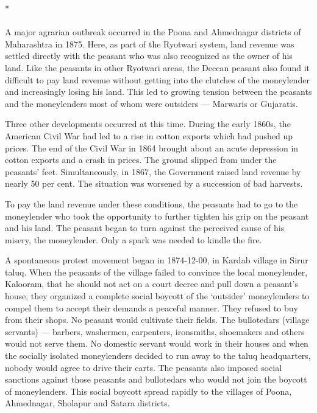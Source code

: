 \begin{center}*\end{center}

\paragraph*{}
A major agrarian outbreak occurred in the Poona and Ahmednagar districts of Maharashtra in 1875. Here, as part of the Ryotwari system, land revenue was settled directly with the peasant who was also recognized as the owner of his land. Like the peasants in other Ryotwari areas, the Deccan peasant also found it difficult to pay land revenue without getting into the clutches of the moneylender and increasingly losing his land. This led to growing tension between the peasants and the moneylenders most of whom were outsiders — Marwaris or Gujaratis.

Three other developments occurred at this time. During the early 1860s, the American Civil War had led to a rise in cotton exports which had pushed up prices. The end of the Civil War in 1864 brought about an acute depression in cotton exports and a crash in prices. The ground slipped from under the peasants' feet. Simultaneously, in 1867, the Government raised land revenue by nearly 50 per cent. The situation was worsened by a succession of bad harvests.

To pay the land revenue under these conditions, the peasants had to go to the moneylender who took the opportunity to further tighten his grip on the peasant and his land. The peasant began to turn against the perceived cause of his misery, the moneylender. Only a spark was needed to kindle the fire.

A spontaneous protest movement began in 1874-12-00, in Kardab village in Sirur taluq. When the peasants of the village failed to convince the local moneylender, Kalooram, that he should not act on a court decree and pull down a peasant's house, they organized a complete social boycott of the `outsider' moneylenders to compel them to accept their demands a peaceful manner. They refused to buy from their shops. No peasant would cultivate their fields. The bullotedars (village servants) — barbers, washermen, carpenters, ironsmiths, shoemakers and others would not serve them. No domestic servant would work in their houses and when the socially isolated moneylenders decided to run away to the taluq headquarters, nobody would agree to drive their carts. The peasants also imposed social sanctions against those peasants and bullotedars who would not join the boycott of moneylenders. This social boycott spread rapidly to the villages of Poona, Ahmednagar, Sholapur and Satara districts.

